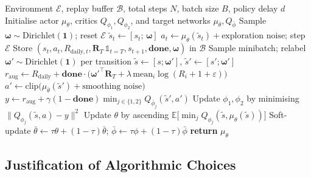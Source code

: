 \begin{algorithm}[ht]
\caption{Concave-Augmented Pareto Q-Learning (CAPQL)}
\label{alg:capql}
\begin{algorithmic}[1]
\Require Environment $\mathcal{E}$, replay buffer $\mathcal{B}$, total steps $N$, batch size $B$, policy delay $d$
\State Initialise actor $\mu_\theta$, critics $Q_{\phi_1}, Q_{\phi_2}$, and target networks $\mu_{\bar\theta}, Q_{\bar\phi}$
    \State Sample $\boldsymbol{\omega} \sim \mathrm{Dirichlet}(\mathbf{1})$; reset $\mathcal{E}$
  \EndIf
  \State $\tilde{s}_t \leftarrow [s_t;\,\boldsymbol{\omega}]$
  \State $a_t \leftarrow \mu_\theta(\tilde{s}_t) + \text{exploration noise}$; step $\mathcal{E}$
  \State Store $(s_t, a_t, R_{\text{daily},t}, \mathbf{R}_T\,\mathbb{1}_{t=T}, s_{t+1}, \textbf{done}, \boldsymbol{\omega})$ in $\mathcal{B}$
    \State Sample minibatch; relabel $\boldsymbol{\omega}' \sim \mathrm{Dirichlet}(\mathbf{1})$ per transition
    \State $\tilde{s} \leftarrow [s;\boldsymbol{\omega}']$,\; $\tilde{s}' \leftarrow [s';\boldsymbol{\omega}']$
    \State $r_{\text{aug}} \leftarrow R_{\text{daily}} + \textbf{done}\cdot\big(\boldsymbol{\omega}'^{\top}\mathbf{R}_T + \lambda\,\mathrm{mean}_i\log(R_i{+}1{+}\varepsilon)\big)$
    \State $a' \leftarrow \mathrm{clip}\big(\mu_{\bar\theta}(\tilde{s}') + \text{smoothing noise}\big)$
    \State $y \leftarrow r_{\text{aug}} + \gamma(1-\textbf{done})\min_{j \in \{1,2\}} Q_{\bar\phi_j}(\tilde{s}', a')$
    \State Update $\phi_1, \phi_2$ by minimising $\|Q_{\phi_j}(\tilde{s},a) - y\|^2$
      \State Update $\theta$ by ascending $\mathbb{E}\big[\min_j Q_{\phi_j}(\tilde{s}, \mu_\theta(\tilde{s}))\big]$
      \State Soft-update $\bar\theta \leftarrow \tau\theta + (1{-}\tau)\bar\theta$;\;
            $\bar\phi \leftarrow \tau\phi + (1{-}\tau)\bar\phi$
    \EndIf
  \EndIf
\EndFor
\State \textbf{return} $\mu_\theta$
\end{algorithmic}
\end{algorithm}


\subsection{Justification of Algorithmic Choices}

